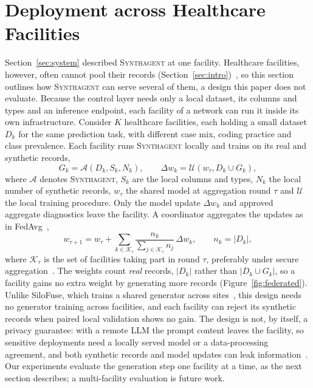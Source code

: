 \documentclass[conference]{IEEEtran}
\newcommand{\system}{\textsc{Synthagent}\xspace}
\begin{document}
\section{Deployment across Healthcare Facilities}
\label{sec:deployment}
Section~\ref{sec:system} described \system at one facility. Healthcare facilities, however, often cannot pool their records (Section~\ref{sec:intro})~\cite{rieke2020digitalhealth,sheller2020medicine}, so this section outlines how \system can serve several of them, a design this paper does not evaluate. Because the control layer needs only a local dataset, its columns and types and an inference endpoint, each facility of a network can run it inside its own infrastructure. Consider $K$ healthcare facilities, each holding a small dataset $D_k$ for the same prediction task, with different case mix, coding practice and class prevalence. Each facility runs \system locally and trains on its real and synthetic records,
\begin{equation}
G_k=\mathcal{A}(D_k,S_k,N_k),\qquad
\Delta w_k=\mathcal{U}(w_\tau,D_k\cup G_k),
\label{eq:local-federated}
\end{equation}
where $\mathcal{A}$ denotes \system, $S_k$ are the local columns and types, $N_k$ the local number of synthetic records, $w_\tau$ the shared model at aggregation round $\tau$ and $\mathcal{U}$ the local training procedure. Only the model update $\Delta w_k$ and approved aggregate diagnostics leave the facility. A coordinator aggregates the updates as in FedAvg~\cite{mcmahan2017fedavg,kairouz2021federated},
\begin{equation}
w_{\tau+1}=w_\tau+\sum_{k\in\mathcal{K}_\tau}\frac{n_k}{\sum_{j\in\mathcal{K}_\tau}n_j}\,\Delta w_k,\qquad n_k=|D_k|,
\label{eq:federated-aggregate}
\end{equation}
where $\mathcal{K}_\tau$ is the set of facilities taking part in round $\tau$, preferably under secure aggregation~\cite{bonawitz2017secure}. The weights count \emph{real} records, $|D_k|$ rather than $|D_k\cup G_k|$, so a facility gains no extra weight by generating more records (Figure~\ref{fig:federated}). Unlike SiloFuse, which trains a shared generator across sites~\cite{shankar2024silofuse}, this design needs no generator training across facilities, and each facility can reject its synthetic records when paired local validation shows no gain. The design is not, by itself, a privacy guarantee: with a remote LLM the prompt content leaves the facility, so sensitive deployments need a locally served model or a data-processing agreement, and both synthetic records and model updates can leak information~\cite{chen2024modeltrip}. Our experiments evaluate the generation step one facility at a time, as the next section describes; a multi-facility evaluation is future work.
\end{document}
